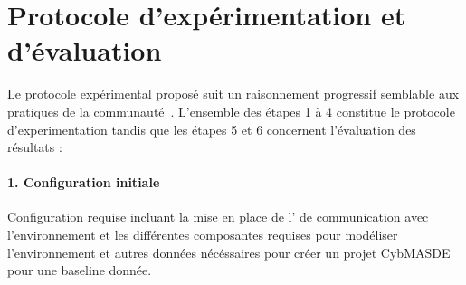 \section{Protocole d'expérimentation et d'évaluation}\label{sec:protocole_experimental}

Le protocole expérimental proposé suit un raisonnement progressif semblable aux pratiques de la communauté~\cite{papoudakis2021agent}.
L'ensemble des étapes 1 à 4 constitue le protocole d'experimentation tandis que les étapes 5 et 6 concernent l'évaluation des résultats :

\paragraph{1. Configuration initiale}
Configuration requise incluant la mise en place de l’  de communication avec l'environnement et les différentes composantes requises pour modéliser l'environnement et autres données nécéssaires pour créer un projet CybMASDE pour une baseline donnée.

